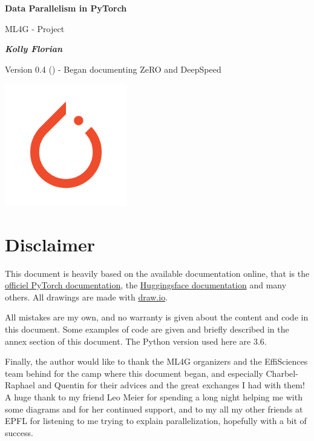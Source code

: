 \documentclass{article}
\begin{document}
\begin{titlepage}
  \begin{center}
    \Huge
    \textbf{\textcolor{def}{Data Parallelism in PyTorch}}
    \vspace{0.9cm}

    \LARGE
    ML4G - Project

    \vspace{1.9cm}
    \Large
    \textbf{\emph{Kolly Florian}}
    \vspace{5cm}
  \end{center}
  Version 0.4 (\DTMnow) - Began documenting ZeRO and DeepSpeed
  \begin{center}
    \vspace{5cm}
    \includegraphics[width=0.4\textwidth]{images/pytorch-logo.png}
    \vspace{10cm}
  \end{center}
\end{titlepage}

\setlength{\parindent}{0em}
\setlength{\parskip}{0.2em}

\tableofcontents
\newpage

\section{Disclaimer}
This document is heavily based on the available documentation online, that is the \href{https://pytorch.org/docs/stable/index.html}{officiel PyTorch documentation}, the \href{https://huggingface.co/docs}{Huggingsface documentation} and many others. All drawings are made with \href{https://www.draw.io}{draw.io}.

All mistakes are my own, and no warranty is given about the content and code in this document. Some examples of code are given and briefly described in the annex section of this document. The Python version used here are 3.6.

Finally, the author would like to thank the ML4G organizers and the EffiSciences team behind for the camp where this document began, and especially Charbel-Raphael and Quentin for their advices and the great exchanges I had with them! A huge thank to my friend Leo Meier for spending a long night helping me with some diagrams and for her continued support, and to my all my other friends at EPFL for listening to me trying to explain parallelization, hopefully with a bit of success.
\end{document}
